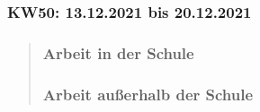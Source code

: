 
\subsubsection{KW50: 13.12.2021 bis 20.12.2021}
\begin{quote}
	\subsubsection*{Arbeit in der Schule}
	

	\subsubsection*{Arbeit außerhalb der Schule}


\end{quote}
